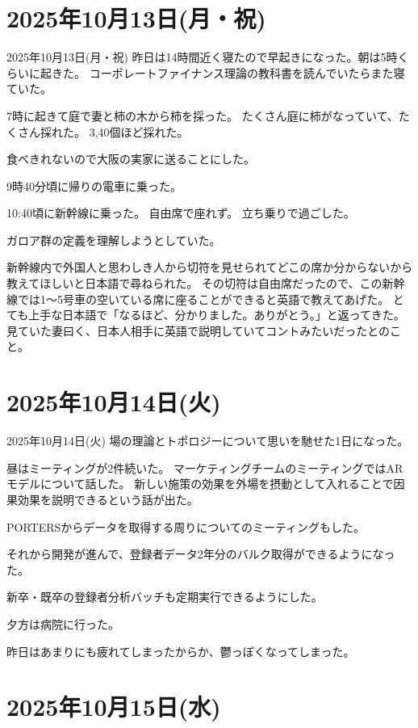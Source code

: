 \documentclass[dvipdfmx, autodetect-engine, aspectratio=169, 10.5pt]{beamer}
\begin{document}
\section{2025年10月13日(月・祝)}

\begin{frame}{2025年10月13日(月・祝)}
昨日は14時間近く寝たので早起きになった。朝は5時くらいに起きた。
コーポレートファイナンス理論の教科書を読んでいたらまた寝ていた。

7時に起きて庭で妻と柿の木から柿を採った。
たくさん庭に柿がなっていて、たくさん採れた。
3,40個ほど採れた。

食べきれないので大阪の実家に送ることにした。

9時40分頃に帰りの電車に乗った。

10:40頃に新幹線に乗った。
自由席で座れず。
立ち乗りで過ごした。

ガロア群の定義を理解しようとしていた。

新幹線内で外国人と思わしき人から切符を見せられてどこの席か分からないから教えてほしいと日本語で尋ねられた。
その切符は自由席だったので、この新幹線では1〜5号車の空いている席に座ることができると英語で教えてあげた。
とても上手な日本語で「なるほど、分かりました。ありがとう。」と返ってきた。
見ていた妻曰く、日本人相手に英語で説明していてコントみたいだったとのこと。
\end{frame}

\section{2025年10月14日(火)}

\begin{frame}{2025年10月14日(火)}
場の理論とトポロジーについて思いを馳せた1日になった。

昼はミーティングが2件続いた。
マーケティングチームのミーティングではARモデルについて話した。
新しい施策の効果を外場を摂動として入れることで因果効果を説明できるという話が出た。

PORTERSからデータを取得する周りについてのミーティングもした。

それから開発が進んで、登録者データ2年分のバルク取得ができるようになった。

新卒・既卒の登録者分析バッチも定期実行できるようにした。

夕方は病院に行った。

昨日はあまりにも疲れてしまったからか、鬱っぽくなってしまった。
\end{frame}

\section{2025年10月15日(水)}
\end{document}
